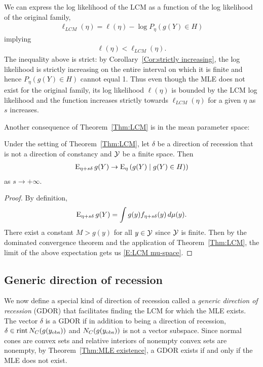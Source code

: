 We can express the log likelihood of the LCM as a function of the 
log likelihood of the original family,
\begin{align} \label{E:LCM ll bound}
 \ell_{LCM}(\eta) = \ell(\eta) - \log P_\eta(g(Y) \in H)
\end{align}
implying
\begin{align*}
	\ell(\eta) < \ell_{LCM}(\eta).	
\end{align*}
The inequality above is strict: by Corollary~\ref{Cor:strictly increasing}, the 
log likelihood is strictly increasing on the entire interval on which it is finite
and hence $P_\eta(g(Y) \in H)$ cannot equal 1.
Thus even though the MLE does not exist for the original family, its log likelihood
$\ell(\eta)$ is bounded by the LCM log likelihood and the function increases strictly
towards $\ell_{LCM}(\eta)$ for a given $\eta$ as $s$ increases.

Another consequence of Theorem~\ref{Thm:LCM} is in the mean parameter space:
\begin{corollary} \label{Cor:LCM mu-space}
Under the setting of Theorem~\ref{Thm:LCM}, let $\delta$ be a direction of 
recession that is not a direction of constancy and ${\mathcal Y}$ be a finite space.  Then
\begin{align} \label{E:LCM mu-space}
	\operatorname{E}_{\eta+ s\delta} g(Y) \to \operatorname{E}_\eta \left ( g(Y) \mid g(Y) \in H ) \right )
\end{align}
as $s \to +\infty$.
\end{corollary}
\begin{proof}
By definition,
\begin{align*}
	\operatorname{E}_{\eta+ s\delta} g(Y) = \int g(y) f_{\eta+ s\delta}(y) \, d\mu(y).
\end{align*}
There exist a constant $M > g(y)$ for all $y \in {\mathcal Y}$ since ${\mathcal Y}$ is finite.  Then
by the dominated convergence theorem and the application of Theorem~\ref{Thm:LCM}, 
the limit of the above expectation gets us \eqref{E:LCM mu-space}.
\end{proof}

\subsection{Generic direction of recession}
We now define a special kind of direction of recession called a 
\emph{generic direction of recession} (GDOR) that facilitates finding the 
LCM for which the MLE exists.
The vector $\delta$ is a GDOR if in addition to being a direction of recession,  
$\delta \in \operatorname{rint} N_C(g(y_{\text{obs}}))$ and $N_C(g(y_{\text{obs}}))$ is not a vector subspace.
Since normal cones are convex sets and relative interiors of nonempty convex sets 
are nonempty, by Theorem~\ref{Thm:MLE existence},
a GDOR exists if and only if the MLE does not exist.

